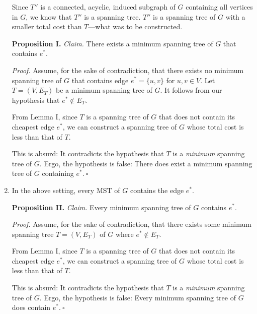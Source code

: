 \begin{enumerate}
\begin{solution}
Since $T''$ is a connected, acyclic, induced subgraph of $G$ containing all vertices in $G$, we know that $T''$ is a spanning tree. $T''$ is a spanning tree of $G$ with a smaller total cost than $T$---what was to be constructed.

\textbf{Proposition I. }\textit{Claim. }There exists a minimum spanning tree of $G$ that contains $e^*$.

\textit{Proof. }Assume, for the sake of contradiction, that there exists no minimum spanning tree of $G$ that contains edge $e^*=\{u,v\}$ for $u,v\in V$. Let $T=(V,E_T)$ be a minimum spanning tree of $G$. It follows from our hypothesis that $e^*\notin E_T$.

From Lemma I, since $T$ is a spanning tree of $G$ that does not contain its cheapest edge $e^*$, we can construct a spanning tree of $G$ whose total cost is less than that of $T$.

This is absurd: It contradicts the hypothesis that $T$ is a \textit{minimum} spanning tree of $G$. Ergo, the hypothesis is false: There does exist a minimum spanning tree of $G$ containing $e^*.~\square$
\end{solution}
\newpage
\item In the above setting, every MST of $G$ contains the edge $e^*$.
\begin{solution}
\textbf{Proposition II. }\textit{Claim. }Every minimum spanning tree of $G$ contains $e^*$.

\textit{Proof. }Assume, for the sake of contradiction, that there exists some minimum spanning tree $T=(V,E_T)$ of $G$ where $e^*\notin E_T$.

From Lemma I, since $T$ is a spanning tree of $G$ that does not contain its cheapest edge $e^*$, we can construct a spanning tree of $G$ whose total cost is less than that of $T$.

This is absurd: It contradicts the hypothesis that $T$ is a \textit{minimum} spanning tree of $G$. Ergo, the hypothesis is false: Every minimum spanning tree of $G$ does contain $e^*.~\square$
\end{solution}
\newpage
\end{enumerate}
